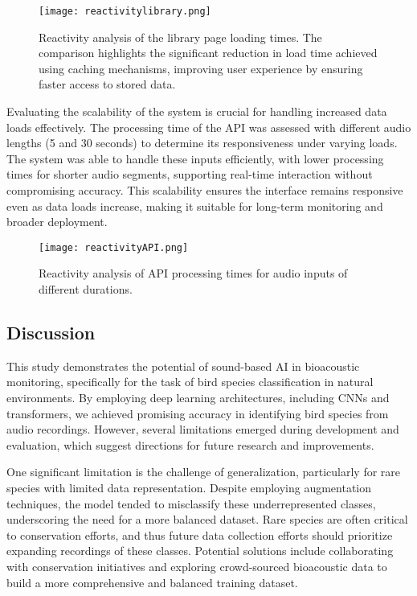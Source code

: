 \begin{figure}[h]
    \centering
    \texttt{[image: reactivitylibrary.png]}
    \caption{ Reactivity analysis of the library page loading times. The comparison highlights the significant reduction in load time achieved using caching mechanisms, improving user experience by ensuring faster access to stored data.}
    \vspace{0.1cm}
    \label{fig:reactivity_lib}
\end{figure}

Evaluating the scalability of the system is crucial for handling increased data loads effectively. The processing time of the API was assessed with different audio lengths (5 and 30 seconds) to determine its responsiveness under varying loads. The system was able to handle these inputs efficiently, with lower processing times for shorter audio segments, supporting real-time interaction without compromising accuracy. This scalability ensures the interface remains responsive even as data loads increase, making it suitable for long-term monitoring and broader deployment.

\begin{figure}[h]
    \centering
    \texttt{[image: reactivityAPI.png]}
    \caption{Reactivity analysis of API processing times for audio inputs of different durations.}
    \vspace{0.1cm}
    \label{fig:reactivity_api}
\end{figure}

\subsection{Discussion}
This study demonstrates the potential of sound-based AI in bioacoustic monitoring, specifically for the task of bird species classification in natural environments. By employing deep learning architectures, including CNNs and transformers, we achieved promising accuracy in identifying bird species from audio recordings. However, several limitations emerged during development and evaluation, which suggest directions for future research and improvements.

One significant limitation is the challenge of generalization, particularly for rare species with limited data representation. Despite employing augmentation techniques, the model tended to misclassify these underrepresented classes, underscoring the need for a more balanced dataset. Rare species are often critical to conservation efforts, and thus future data collection efforts should prioritize expanding recordings of these classes. Potential solutions include collaborating with conservation initiatives and exploring crowd-sourced bioacoustic data to build a more comprehensive and balanced training dataset.

